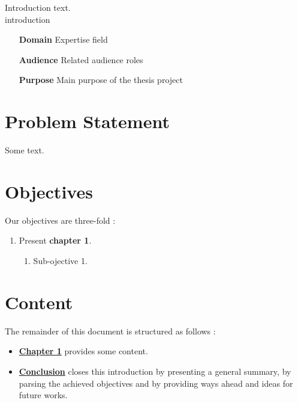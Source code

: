 \begin{chaptercover}{Introduction}%
{
{\large {}  text.\newline\\}}%
{introduction}

\begin{projectdata}
\begin{itemize}[labelsep=1cm]
  \item [\textbf{Domain}] Expertise field
  \item [\textbf{Audience}] Related audience roles
  \item [\textbf{Purpose}] Main purpose of the thesis project
\end{itemize}
\end{projectdata}


\section{Problem Statement}
Some text.


\section{Objectives}
Our objectives are three-fold :
\begin{enumerate}[itemsep=0.2cm,topsep=0.1cm]
  \item Present \textbf{chapter 1}.
  \begin{enumerate}[label=\Alph* --,align=left,itemsep=.1cm]
    \item Sub-ojective 1.
  \end{enumerate}
\end{enumerate}


\section{Content}
The remainder of this document is structured as follows :
\begin{itemize}[itemsep=0.1cm,topsep=0.1cm]
  \item \hyperref[chapter1]{\bfseries Chapter 1} provides some content.
  \item \hyperref[conclusion]{\bfseries Conclusion} closes this introduction by presenting a general summary, by parsing the achieved objectives and by providing ways ahead and ideas for future works.
\end{itemize}


\end{chaptercover}
